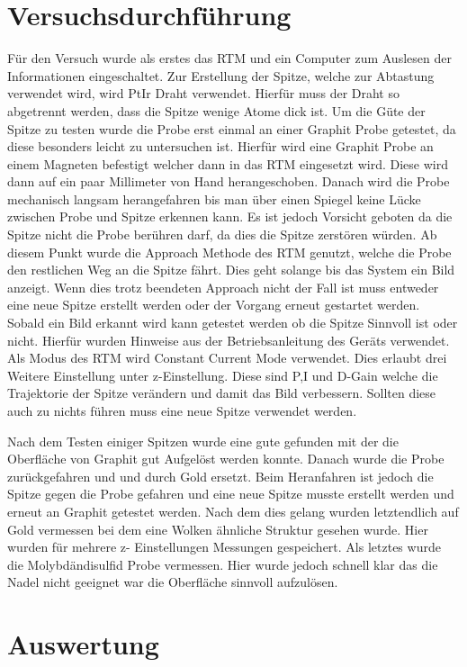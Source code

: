 \section{Versuchsdurchführung}
Für den Versuch wurde als erstes das RTM und ein Computer zum Auslesen der Informationen eingeschaltet. Zur Erstellung der Spitze, welche zur Abtastung verwendet wird, wird PtIr Draht verwendet. Hierfür muss der Draht so abgetrennt werden, dass die Spitze wenige Atome dick ist. Um die Güte der Spitze zu testen wurde die Probe erst einmal an einer Graphit Probe getestet, da diese besonders leicht zu untersuchen ist. Hierfür wird eine Graphit Probe an einem Magneten befestigt welcher dann in das RTM eingesetzt wird. Diese wird dann auf ein paar Millimeter von Hand herangeschoben. Danach wird die Probe mechanisch langsam herangefahren bis man über einen Spiegel keine Lücke zwischen Probe und Spitze erkennen kann. Es ist jedoch Vorsicht geboten da die Spitze nicht die Probe berühren darf, da dies die Spitze zerstören würden. Ab diesem Punkt wurde die Approach Methode des RTM genutzt, welche die Probe den restlichen Weg an die Spitze fährt. Dies geht solange bis das System ein Bild anzeigt. Wenn dies trotz beendeten Approach nicht der Fall ist muss entweder eine neue Spitze erstellt werden oder der Vorgang erneut gestartet werden. Sobald ein Bild erkannt wird kann getestet werden ob die Spitze Sinnvoll ist oder nicht. Hierfür wurden Hinweise aus der Betriebsanleitung des Geräts verwendet\cite{RMT}. Als Modus des RTM wird Constant Current Mode verwendet. Dies erlaubt drei Weitere Einstellung unter z-Einstellung. Diese sind P,I und D-Gain welche die Trajektorie der Spitze verändern und damit das Bild verbessern. Sollten diese auch zu nichts führen muss eine neue Spitze verwendet werden. \par Nach dem Testen einiger Spitzen wurde eine gute gefunden mit der die Oberfläche von Graphit gut Aufgelöst werden konnte. Danach wurde die Probe zurückgefahren und und durch Gold ersetzt. Beim Heranfahren ist jedoch die Spitze gegen die Probe gefahren und eine neue Spitze musste erstellt werden und erneut an Graphit getestet werden. Nach dem dies gelang wurden letztendlich auf Gold vermessen bei dem eine Wolken ähnliche Struktur gesehen wurde. Hier wurden für mehrere z- Einstellungen Messungen gespeichert. Als letztes wurde die Molybdändisulfid Probe vermessen. Hier wurde jedoch schnell klar das die Nadel nicht geeignet war die Oberfläche sinnvoll aufzulösen.
\section{Auswertung}
